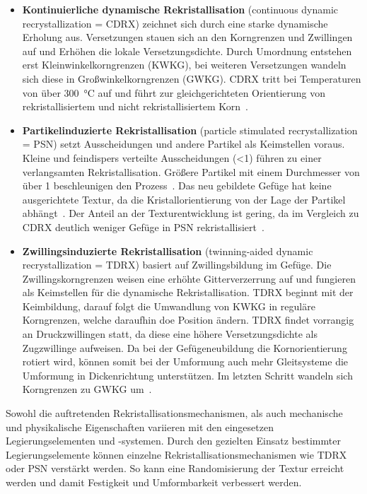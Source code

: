 \begin{itemize}
    \item \textbf{Kontinuierliche dynamische Rekristallisation} (continuous dynamic recrystallization = CDRX) zeichnet sich durch eine starke dynamische Erholung aus.
    Versetzungen stauen sich an den Korngrenzen und Zwillingen auf und Erhöhen die lokale Versetzungsdichte.
    Durch Umordnung entstehen erst Kleinwinkelkorngrenzen (KWKG), bei weiteren Versetzungen wandeln sich diese in Großwinkelkorngrenzen (GWKG).
    CDRX tritt bei Temperaturen von über \SI{300}{\degreeCelsius} auf und führt zur gleichgerichteten Orientierung von rekristallisiertem und nicht rekristallisiertem Korn~\cite{NarayanaMurty2015}.
    \item \textbf{Partikelinduzierte Rekristallisation} (particle stimulated recrystallization = PSN) setzt Ausscheidungen und andere Partikel als Keimstellen voraus.
    Kleine und feindispers verteilte Ausscheidungen (<\SI{1}{\mum}) führen zu einer verlangsamten Rekristallisation.
    Größere Partikel mit einem Durchmesser von über \SI{1}{\mum} beschleunigen den Prozess~\cite{Kittner.2019}.
    Das neu gebildete Gefüge hat keine ausgerichtete Textur, da die Kristallorientierung von der Lage der Partikel abhängt~\cite{Ullmann2019}.
    Der Anteil an der Texturentwicklung ist gering, da im Vergleich zu CDRX deutlich weniger Gefüge in PSN rekristallisiert~\cite{Ullmann2014}.
    \item \textbf{Zwillingsinduzierte Rekristallisation} (twinning-aided dynamic recrystallization = TDRX) basiert auf Zwillingsbildung im Gefüge.
    Die Zwillingskorngrenzen weisen eine erhöhte Gitterverzerrung auf und fungieren als Keimstellen für die dynamische Rekristallisation.
    TDRX beginnt mit der Keimbildung, darauf folgt die Umwandlung von KWKG in reguläre Korngrenzen, welche daraufhin doe Position ändern.
    TDRX findet vorrangig an Druckzwillingen statt, da diese eine höhere Versetzungsdichte als Zugzwillinge aufweisen.
    Da bei der Gefügeneubildung die Kornorientierung rotiert wird, können somit bei der Umformung auch mehr Gleitsysteme die Umformung in Dickenrichtung unterstützen.
    Im letzten Schritt wandeln sich Korngrenzen zu GWKG um~\cite{Kittner.2019}.
\end{itemize}

Sowohl die auftretenden Rekristallisationsmechanismen, als auch mechanische und physikalische Eigenschaften variieren mit den eingesetzen Legierungselementen und -systemen.
Durch den gezielten Einsatz bestimmter Legierungselemente können einzelne Rekristallisationsmechanismen wie TDRX oder PSN verstärkt werden.
So kann eine Randomisierung der Textur erreicht werden und damit Festigkeit und Umformbarkeit verbessert werden.

